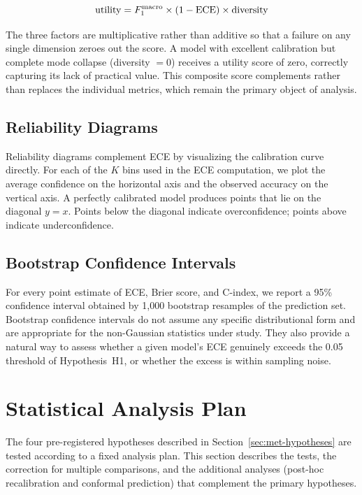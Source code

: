 \begin{equation}
    \operatorname{utility} = F_1^{\text{macro}} \times (1 - \textrm{ECE}) \times 
    \operatorname{diversity}
    \label{eq:composite}
\end{equation}

The three factors are multiplicative rather than additive so that a 
failure on any single dimension zeroes out the score. A model with 
excellent calibration but complete mode collapse (diversity $= 0$) 
receives a utility score of zero, correctly capturing its lack of 
practical value. This composite score complements rather than replaces 
the individual metrics, which remain the primary object of analysis.

\subsection{Reliability Diagrams}
\label{subsec:met-reliab}

Reliability diagrams complement ECE by visualizing the calibration curve 
directly. For each of the $K$ bins used in the ECE computation, we plot 
the average confidence on the horizontal axis and the observed accuracy 
on the vertical axis. A perfectly calibrated model produces points that 
lie on the diagonal $y = x$. Points below the diagonal indicate 
overconfidence; points above indicate underconfidence.

\subsection{Bootstrap Confidence Intervals}
\label{subsec:met-bootstrap}

For every point estimate of ECE, Brier score, and C-index, we report a 
95\% confidence interval obtained by 1{,}000 bootstrap resamples of the 
prediction set. Bootstrap confidence intervals do not assume any specific 
distributional form and are appropriate for the non-Gaussian statistics 
under study. They also provide a natural way to assess whether a given 
model's ECE genuinely exceeds the 0.05 threshold of Hypothesis~H1, or 
whether the excess is within sampling noise.

\section{Statistical Analysis Plan}
\label{sec:met-stats}

The four pre-registered hypotheses described in 
Section~\ref{sec:met-hypotheses} are tested according to a fixed analysis 
plan. This section describes the tests, the correction for multiple 
comparisons, and the additional analyses (post-hoc recalibration and 
conformal prediction) that complement the primary hypotheses.

